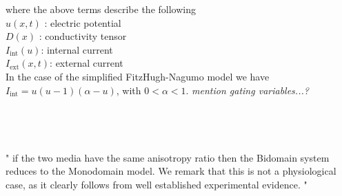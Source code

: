 \documentclass[../draft_1.tex]{subfiles}
\begin{document}
where the above terms describe the following 
\smallskip
\\
$u(x,t)$ : electric potential \\
$D(x) $  : conductivity tensor \\
$ I_{\text{int}}(u) $: internal current \\
$I_{\text{ext}}(x,t)$: external current 
\bigskip
\\
In the case of the simplified FitzHugh-Nagumo model we have $I_{\text{int}}= u (u - 1 )(\alpha - u)$, with $ 0 < \alpha < 1$. \textit{mention gating variables...? }
\smallskip
\\
\smallskip
\\
\smallskip
\\
\smallskip
\\
\smallskip
\\
" if the two media have the same anisotropy ratio then the Bidomain system reduces to the Monodomain model. We remark that this is not a physiological case, as it clearly follows from well established experimental evidence. "
\end{document}
